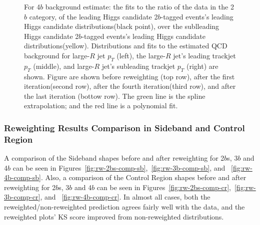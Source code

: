 \begin{figure}[htbp!]
\begin{center}
\caption{For 4$b$ background estimate: the fits to the ratio of the data in the 2$b$ category, of the leading Higgs candidate 2$b$-tagged events's leading Higgs candidate distributions(black point), over the sublleading Higgs candidate 2$b$-tagged events's leading Higgs candidate distributions(yellow). Distributions and fits to the estimated QCD background for large-$R$ jet $p_{T}$ (left),  the large-$R$ jet's leading trackjet $p_T$ (middle), and large-$R$ jet's subleading trackjet $p_T$ (right) are shown.  Figure are shown before reweighting (top row), after the first iteration(second row), after the fourth iteration(third row), and after the last iteration (bottow row). The green line is the spline extrapolation; and the red line is a polynomial fit.}
\label{fig:rw-4b-subl}
\end{center}
\end{figure}


\pagebreak{}
\subsubsection{Reweighting Results Comparison in Sideband and Control Region}
\label{sec:boosted-Reweight-compare}

A comparison of the Sideband shapes before and after reweighting for 2$b$s, 3$b$ and 4$b$ can be seen in Figures~\ref{fig:rw-2bs-comp-sb},~\ref{fig:rw-3b-comp-sb}, and ~\ref{fig:rw-4b-comp-sb}. Also, a comparison of the Control Region shapes before and after reweighting for 2$b$s, 3$b$ and 4$b$ can be seen in Figures~\ref{fig:rw-2bs-comp-cr},~\ref{fig:rw-3b-comp-cr}, and ~\ref{fig:rw-4b-comp-cr}. In almost all cases, both the reweighted/non-reweighted prediction agrees fairly well with the data, and the reweighted plots' KS score improved from non-reweighted distributions. 

